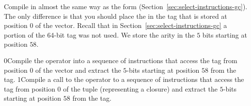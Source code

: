 \documentclass[7x10,nocrop]{TimesAPriori_MIT}%
\def\racketEd{0}
\def\pythonEd{1}
\def\edition{0}
\newcommand{\racket}[1]{{\if\edition\racketEd{#1}\fi}}
\newcommand{\python}[1]{{\if\edition\pythonEd #1\fi}}
\begin{document}
Compile  in almost the
same way as the  form
(Section~\ref{sec:select-instructions-gc}). The only difference is
that you should place the  in the tag that is stored at
position $0$ of the vector. Recall that in
Section~\ref{sec:select-instructions-gc} a portion of the 64-bit tag
was not used. We store the arity in the $5$ bits starting at position
$58$.

\racket{Compile the  operator into a sequence of
instructions that access the tag from position $0$ of the vector and
extract the $5$-bits starting at position $58$ from the tag.}
%
\python{Compile a call to the  operator to a sequence of
instructions that access the tag from position $0$ of the tuple
(representing a closure) and extract the $5$-bits starting at position
$58$ from the tag.}
\end{document}
